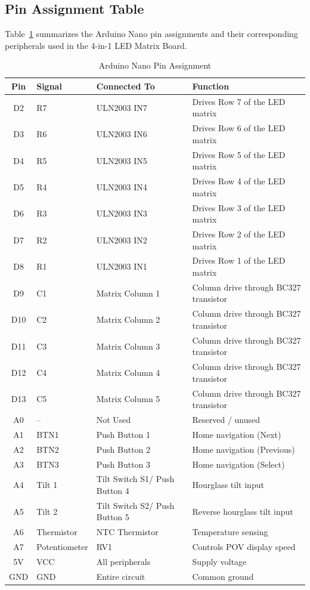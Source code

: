 \documentclass[12pt,a4paper]{article}
\begin{document}
\subsection{Pin Assignment Table}

Table~\ref{tab:pinout} summarizes the Arduino Nano pin assignments and their corresponding peripherals used in the 4-in-1 LED Matrix Board.

\begin{table}[H]
\centering
\caption{Arduino Nano Pin Assignment}
\label{tab:pinout}
\renewcommand{\arraystretch}{1.2}
\begin{tabular}{cllp{6.5cm}}
\toprule
\textbf{Pin} & \textbf{Signal} & \textbf{Connected To} & \textbf{Function} \\
\midrule

D2  & R7 & ULN2003 IN7 & Drives Row 7 of the LED matrix \\
D3  & R6 & ULN2003 IN6 & Drives Row 6 of the LED matrix \\
D4  & R5 & ULN2003 IN5 & Drives Row 5 of the LED matrix \\
D5  & R4 & ULN2003 IN4 & Drives Row 4 of the LED matrix \\
D6  & R3 & ULN2003 IN3 & Drives Row 3 of the LED matrix \\
D7  & R2 & ULN2003 IN2 & Drives Row 2 of the LED matrix \\
D8  & R1 & ULN2003 IN1 & Drives Row 1 of the LED matrix \\

D9  & C1 & Matrix Column 1 & Column drive through BC327 transistor \\
D10 & C2 & Matrix Column 2 & Column drive through BC327 transistor \\
D11 & C3 & Matrix Column 3 & Column drive through BC327 transistor \\
D12 & C4 & Matrix Column 4 & Column drive through BC327 transistor \\
D13 & C5 & Matrix Column 5 & Column drive through BC327 transistor \\

A0 & -- & Not Used & Reserved / unused \\

A1 & BTN1 & Push Button 1 & Home navigation (Next) \\
A2 & BTN2 & Push Button 2 & Home navigation (Previous) \\
A3 & BTN3 & Push Button 3 & Home navigation (Select) \\
A4 & Tilt 1 & Tilt Switch S1/ Push Button 4 & Hourglass tilt input \\
A5 & Tilt 2 & Tilt Switch S2/ Push Button 5 & Reverse hourglass tilt input \\
A6 & Thermistor & NTC Thermistor & Temperature sensing \\
A7 & Potentiometer & RV1 & Controls POV display speed \\

5V & VCC & All peripherals & Supply voltage \\
GND & GND & Entire circuit & Common ground \\

\bottomrule
\end{tabular}
\end{table}
\end{document}
